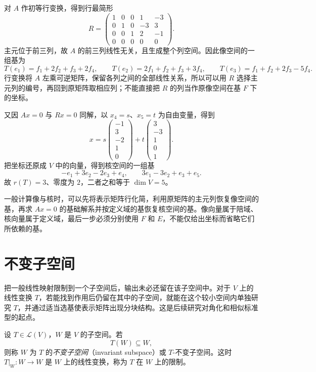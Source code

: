 \begin{solve}
对 $A$ 作初等行变换，得到行最简形
\[
    R=\begin{pmatrix}
        1&0&0&1&-3\\
        0&1&0&-3&3\\
        0&0&1&2&-1\\
        0&0&0&0&0
    \end{pmatrix}.
\]
主元位于前三列，故 $A$ 的前三列线性无关，且生成整个列空间。因此像空间的一组基为
\[
    T(e_1)=f_1+2f_2+f_3+2f_4,\qquad
    T(e_2)=2f_1+f_2+f_3+3f_4,\qquad
    T(e_3)=f_1+f_2+2f_3-5f_4.
\]
行变换将 $A$ 左乘可逆矩阵，保留各列之间的全部线性关系，所以可以用 $R$ 选择主元列的编号，再回到原矩阵取相应列；不能直接把 $R$ 的列当作原像空间在基 $F$ 下的坐标。

又因 $Ax=0$ 与 $Rx=0$ 同解，以 $x_4=s$、$x_5=t$ 为自由变量，得到
\[
    x=s\begin{pmatrix}-1\\3\\-2\\1\\0\end{pmatrix}
      +t\begin{pmatrix}3\\-3\\1\\0\\1\end{pmatrix}.
\]
把坐标还原成 $V$ 中的向量，得到核空间的一组基
\[
    -e_1+3e_2-2e_3+e_4,\qquad
    3e_1-3e_2+e_3+e_5.
\]
故 $r(T)=3$、零度为 $2$，二者之和等于 $\dim V=5$。
\end{solve}

一般计算像与核时，可以先将表示矩阵行化简，利用原矩阵的主元列恢复像空间的基，再求 $Ax=0$ 的基础解系并按定义域的基恢复核空间的基。像向量属于陪域、核向量属于定义域，最后一步必须分别使用 $F$ 和 $E$，不能仅给出坐标而省略它们所依赖的基。

\section{不变子空间}
\label{sec:linear-map-invariant-subspace}

把一般线性映射限制到一个子空间后，输出未必还留在该子空间中。对于 $V$ 上的线性变换 $T$，若能找到作用后仍留在其中的子空间，就能在这个较小空间内单独研究 $T$，并通过适当选基使表示矩阵出现分块结构。这是后续研究对角化和相似标准型的起点。

\begin{definition}
\label{def:invariant-subspace}
设 $T\in\mathcal L(V)$，$W$ 是 $V$ 的子空间。若
\[
    T(W)\subseteq W,
\]
则称 $W$ 为 $T$ 的\emph{不变子空间}（invariant subspace）或 $T$-不变子空间。这时 $T|_W:W\to W$ 是 $W$ 上的线性变换，称为 $T$ 在 $W$ 上的限制。
\end{definition}

